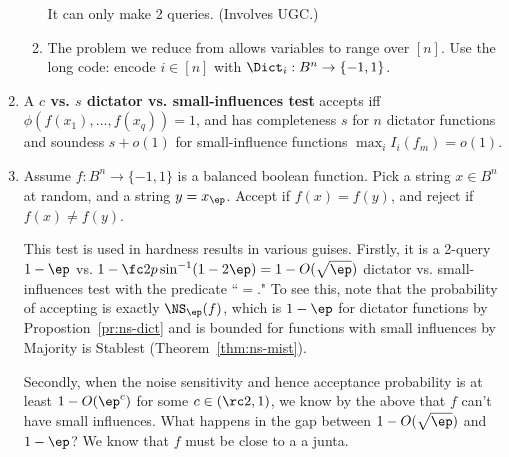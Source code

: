 \begin{enumerate}
\begin{enumerate}
It can only make 2 queries. (Involves UGC.)
\item
The problem we reduce from allows variables to range over $[n]$. Use the long code: encode $i\in [n]$ with $\Dict_i:B^n\to \{-1,1\}$.
\end{enumerate}
\item
\begin{df}
A \textbf{$c$ vs. $s$ dictator vs. small-influences test} accepts iff $\phi(f(x_1),\ldots, f(x_q))=1$, and has completeness $s$ for $n$ dictator functions and soundess $s+o(1)$ for small-influence functions $\max_i I_i(f_m)=o(1)$.
\end{df}
\item
\begin{ex}\label{ex:ns-test}
Assume $f:B^n\to \{-1,1\}$ is a balanced boolean function. Pick a string $x\in B^n$ at random, and a string $y=x_{\ep}$. Accept if $f(x)= f(y)$, and reject if $f(x)\ne f(y)$. 
\end{ex}
This test is used in hardness results in various guises. Firstly, it is a 2-query 
$1-\ep$ vs. $1-\fc2{{p}}\sin^{-1}(1-2\ep)=1-O(\sqrt\ep)$ dictator vs. small-influences test with the predicate ``$=$."
To see this, note that the probability of accepting is exactly $\NS_{\ep}(f)$, which is $1-\ep$ for dictator functions by Propostion~\ref{pr:ns-dict} and is bounded for functions with small influences by Majority is Stablest (Theorem~\ref{thm:ns-mist}).

Secondly, when the noise sensitivity and hence acceptance probability is at least $1-O(\ep^c)$ for some $c\in (\rc2,1)$, we know by the above that $f$ can't have small influences. What happens in the gap between $1-O(\sqrt \ep)$ and $1-\ep$? We know that $f$ must be close to a a junta.


\end{enumerate}
